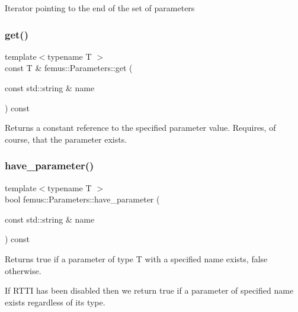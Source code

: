 Iterator pointing to the end of the set of parameters \mbox{\label{classfemus_1_1_parameters_a419ddd3d0965dbca868a5072249b8374}} 
\subsubsection{\texorpdfstring{get()}{get()}}
{\footnotesize\ttfamily template$<$typename T $>$ \\
const T \& femus\+::\+Parameters\+::get (\begin{DoxyParamCaption}\item[{const std\+::string \&}]{name }\end{DoxyParamCaption}) const\hspace{0.3cm}{\ttfamily [inline]}}

\begin{DoxyReturn}{Returns}
a constant reference to the specified parameter value. Requires, of course, that the parameter exists. 
\end{DoxyReturn}
\mbox{\label{classfemus_1_1_parameters_a40552ba34705d99b2a0b7419448c99b4}} 
\subsubsection{\texorpdfstring{have\+\_\+parameter()}{have\_parameter()}}
{\footnotesize\ttfamily template$<$typename T $>$ \\
bool femus\+::\+Parameters\+::have\+\_\+parameter (\begin{DoxyParamCaption}\item[{const std\+::string \&}]{name }\end{DoxyParamCaption}) const\hspace{0.3cm}{\ttfamily [inline]}}

\begin{DoxyReturn}{Returns}
{\ttfamily true} if a parameter of type {\ttfamily T} with a specified name exists, {\ttfamily false} otherwise.
\end{DoxyReturn}
If R\+T\+TI has been disabled then we return {\ttfamily true} if a parameter of specified name exists regardless of its type. \mbox{\label{classfemus_1_1_parameters_a5024ade9b923ccb6ad31320998c12383}} 
